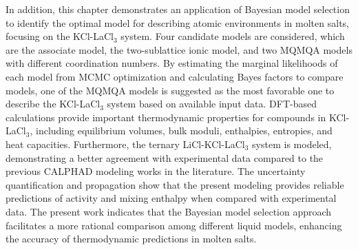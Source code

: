 In addition, this chapter demonstrates an application of Bayesian model selection to identify the optimal model for describing atomic environments in molten salts, focusing on the KCl-LaCl$_3$ system. Four candidate models are considered, which are the associate model, the two-sublattice ionic model, and two MQMQA models with different coordination numbers. By estimating the marginal likelihoods of each model from MCMC optimization and calculating Bayes factors to compare models, one of the MQMQA models is suggested as the most favorable one to describe the KCl-LaCl$_3$ system based on available input data. DFT-based calculations provide important thermodynamic properties for compounds in KCl-LaCl$_3$, including equilibrium volumes, bulk moduli, enthalpies, entropies, and heat capacities. Furthermore, the ternary LiCl-KCl-LaCl$_3$ system is modeled, demonstrating a better agreement with experimental data compared to the previous CALPHAD modeling works in the literature. The uncertainty quantification and propagation show that the present modeling provides reliable predictions of activity and mixing enthalpy when compared with experimental data. The present work indicates that the Bayesian model selection approach facilitates a more rational comparison among different liquid models, enhancing the accuracy of thermodynamic predictions in molten salts.